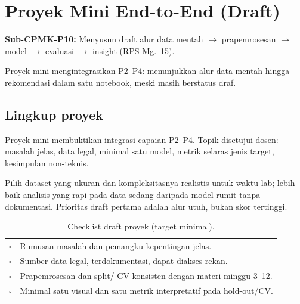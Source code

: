 \documentclass[../main.tex]{subfiles}
\begin{document}
\chapter{Proyek Mini End-to-End (Draft)}

\begin{subcpmk}
  \item \textbf{Sub-CPMK-P10:} Menyusun draft alur data mentah $\rightarrow$ prapemrosesan $\rightarrow$ model $\rightarrow$ evaluasi $\rightarrow$ insight (RPS Mg.\ 15).
\end{subcpmk}


\noindent Proyek mini mengintegrasikan P2--P4: menunjukkan alur data mentah hingga rekomendasi dalam satu notebook, meski masih berstatus draf.

\section{Lingkup proyek}

\begin{konsep}
Proyek mini membuktikan integrasi capaian P2--P4. Topik disetujui dosen: masalah jelas, data legal, minimal satu model, metrik selaras jenis target, kesimpulan non-teknis.
\end{konsep}

Pilih dataset yang ukuran dan kompleksitasnya realistis untuk waktu lab; lebih baik analisis yang rapi pada data sedang daripada model rumit tanpa dokumentasi. Prioritas draft pertama adalah alur utuh, bukan skor tertinggi.



\begin{table}[htbp]
\centering
\caption{Checklist draft proyek (target minimal).}
\label{tab:checklist-proyek}
\begin{tabular}{@{}p{0.6cm}p{11.3cm}@{}}
\toprule
$\square$ & Rumusan masalah dan pemangku kepentingan jelas. \\
$\square$ & Sumber data legal, terdokumentasi, dapat diakses rekan. \\
$\square$ & Prapemrosesan dan split/ CV konsisten dengan materi minggu 3--12. \\
$\square$ & Minimal satu visual dan satu metrik interpretatif pada hold-out/CV. \\
\bottomrule
\end{tabular}
\end{table}
\end{document}
